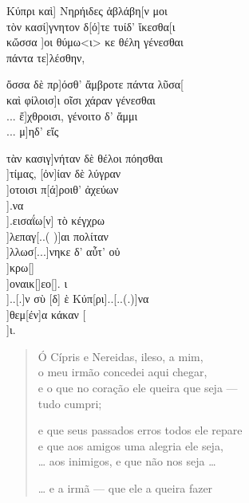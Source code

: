 \begin{gkverse}
Κύπρι καὶ] Νηρήιδες ἀβλάβη[ν μοι\\
		τὸν κασί]γνητον δ[ό]τε τυίδ’ ἴκεσθα[ι\\
κὤσσα ]οι θύμω<ι> κε θέλη γένεσθαι\\
πάντα τε]λέσθην,

ὄσσα δὲ πρ]όσθ’ ἄμβροτε πάντα λῦσα[\\
καὶ φίλοισ]ι οῖσι χάραν γένεσθαι\\
... ἔ]χθροισι, γένοιτο δ’ ἄμμι\\
... μ]ηδ’ εἴς

τὰν κασιγ]νήταν δὲ θέλοι πόησθαι\\
 ]τίμας, [ὀν]ίαν δὲ λύγραν\\
 ]οτοισι π[ά]ροιθ’ ἀχεύων\\
 ].να\\
 ].εισαΐω[ν] τὸ κέγχρω\\
  ]λεπαγ[..(  )]αι πολίταν\\
  ]λλωσ[...]νηκε δ’ αὖτ’ οὐ\\
 ]κρω[]\\
 ]οναικ[\quad]εο[\quad]. ι\\
 ]..[.]ν σὺ [δ] ὲ Κύπ[ρι]..[..(.)]να\\
       ]θεμ[έν]α κάκαν [\\
	       ]ι.	
\end{gkverse}

\begin{verse}
Ó Cípris e Nereidas, ileso, a mim,\\
o meu irmão concedei aqui chegar,\\
e o que no coração ele queira que seja ---\\
tudo cumpri;\\

\medskip

e que seus passados erros todos ele repare\\
e que aos amigos uma alegria ele seja,\\
\ldots{} aos inimigos, e que não nos seja \ldots{}\\

\medskip

\ldots{} e a irmã --- que ele a queira fazer
\end{verse}



